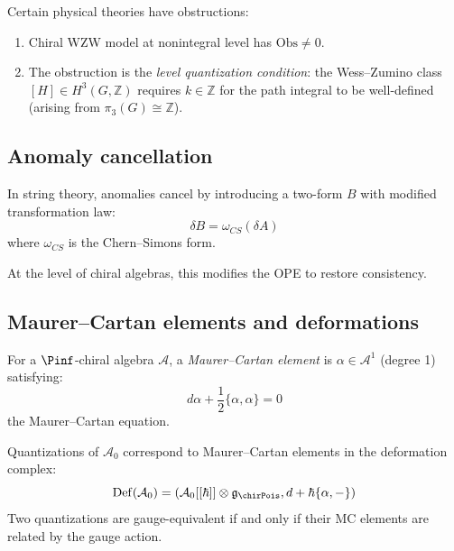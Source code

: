 \begin{example}\label{ex:anomaly}
Certain physical theories have obstructions:
\begin{enumerate}[label=(\roman*)]
\item Chiral WZW model at nonintegral level has $\mathrm{Obs} \neq 0$.
\item The obstruction is the \emph{level quantization condition}: the
 Wess--Zumino class $[H] \in H^3(G, \mathbb{Z})$ requires $k \in \mathbb{Z}$
 for the path integral to be well-defined (arising from $\pi_3(G) \cong \mathbb{Z}$).
\end{enumerate}
\end{example}


\subsection{Anomaly cancellation}

\begin{theorem}\label{thm:green-schwarz}
In string theory, anomalies cancel by introducing a two-form $B$ with modified
transformation law:
\[
\delta B = \omega_{CS}(\delta A)
\]
where $\omega_{CS}$ is the Chern--Simons form.

At the level of chiral algebras, this modifies the OPE to restore consistency.
\end{theorem}


\subsection{Maurer--Cartan elements and deformations}

\begin{definition}\label{def:mc-element}
For a $\Pinf$-chiral algebra $\mathcal{A}$, a \emph{Maurer--Cartan element} is
$\alpha \in \mathcal{A}^1$ (degree 1) satisfying:
\[
d\alpha + \frac{1}{2}\{\alpha, \alpha\} = 0
\]
the Maurer--Cartan equation.
\end{definition}

\begin{theorem}\label{thm:mc-quantization}
Quantizations of $\mathcal{A}_0$ correspond to Maurer--Cartan elements in the
deformation complex:
\[
\mathrm{Def}(\mathcal{A}_0) = (\mathcal{A}_0[[\hbar]] \otimes \mathfrak{g}_{\chirPois}, d + \hbar\{\alpha, -\})
\]
Two quantizations are gauge-equivalent if and only if their MC elements are related by the
gauge action.
\end{theorem}

